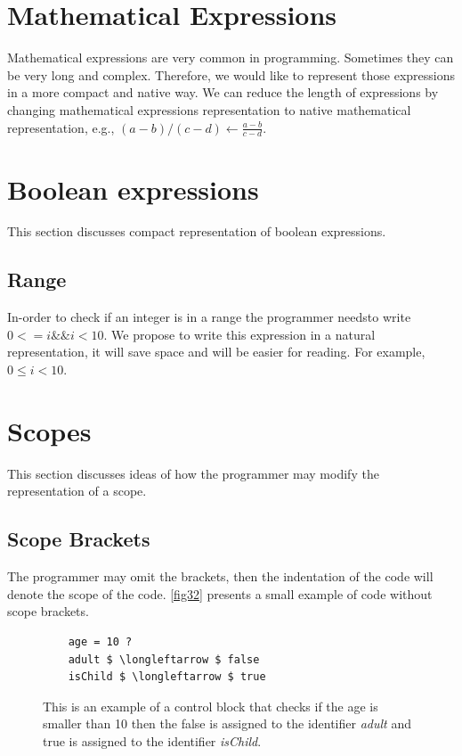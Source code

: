 \section{Mathematical Expressions}
Mathematical expressions are very common in programming. Sometimes they can be very long and complex. Therefore, we would like to represent those expressions in a more compact and native way. We can reduce the length of expressions by changing mathematical expressions representation to native mathematical representation, e.g., $ (a-b)/(c-d) \longleftarrow \frac{a-b}{c-d} $.
\section{Boolean expressions}
This section discusses compact representation of boolean expressions.
\subsection{Range} \label{subsection: Range}
In-order to check if an integer is in a range the programmer needsto write $ 0 <= i \&\& i < 10 $. We propose to write this expression in a natural representation, it will save space and will be easier for reading. For example, $ 0 \leq i < 10 $.
\section{Scopes}
This section discusses ideas of how the programmer may modify the representation of a scope.
\subsection{Scope Brackets}
The programmer may omit the brackets, then the indentation of the code will denote the scope of the code. \autoref{fig32} presents a small example of code without scope brackets.
\begin{figure}[H]
	\begin{lstlisting}
	age = 10 ?
	adult $ \longleftarrow $ false
	isChild $ \longleftarrow $ true
	\end{lstlisting}
	\caption{This is an example of a control block that checks if the age is smaller than 10 then the false is assigned to the identifier \textit{adult} and true is assigned to the identifier \textit{isChild}.}
	\label{fig32}
\end{figure}
